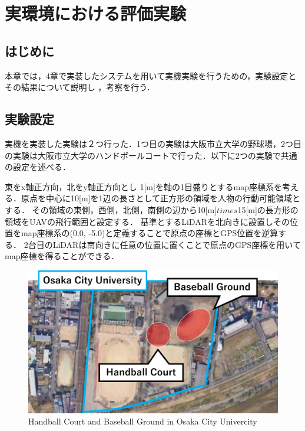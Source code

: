 \documentclass[autodetect-engine,dvipdfmx-if-dvi,ja=standard,a4j,jbase=11pt,magstyle=nomag*]{bxjsreport}
\begin{document}
\chapter[実環境における評価実験]{実環境における評価実験}
\label{chap:sim_nao}


\section{はじめに}
本章では，4章で実装したシステムを用いて実機実験を行うための，実験設定とその結果について説明し
，考察を行う．



\section{実験設定}
実機を実装した実験は２つ行った．1つ目の実験は大阪市立大学の野球場，2つ目の実験は大阪市立大学のハンドボールコートで行った．以下に2つの実験で共通の設定を述べる．

東をx軸正方向，北をy軸正方向とし
1[m]を軸の1目盛りとするmap座標系を考える．原点を中心に10[m]を1辺の長さとして正方形の領域を人物の行動可能領域とする．
その領域の東側，西側，北側，南側の辺から10[m]$times$15[m]の長方形の領域をUAVの飛行範囲と設定する．
基準とするLiDARを北向きに設置しその位置をmap座標系の(0.0, -5.0)と定義することで原点の座標とGPS位置を逆算する．
2台目のLiDARは南向きに任意の位置に置くことで原点のGPS座標を用いてmap座標を得ることができる．

\begin{figure}[t]
    \centering
    \includegraphics[width=\linewidth, clip]{./figure/chapter5/ground.png}
    \caption{Handball Court and Baseball Ground in Osaka City Univercity}
    \label{fig:ground}
\end{figure}
\end{document}
